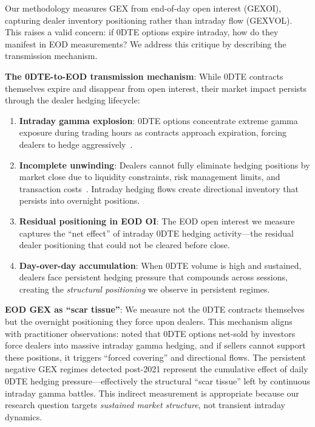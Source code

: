 \vspace{0.2cm}

Our methodology measures GEX from end-of-day open interest (GEX\textunderscore OI), capturing dealer inventory positioning rather than intraday flow (GEX\textunderscore VOL). This raises a valid concern: if 0DTE options expire intraday, how do they manifest in EOD measurements? We address this critique by describing the transmission mechanism.

\vspace{0.2cm}

\noindent\textbf{The 0DTE-to-EOD transmission mechanism}: While 0DTE contracts themselves expire and disappear from open interest, their market impact persists through the dealer hedging lifecycle:

\vspace{0.1cm}

\begin{enumerate}
\item \textbf{Intraday gamma explosion}: 0DTE options concentrate extreme gamma exposure during trading hours as contracts approach expiration, forcing dealers to hedge aggressively~\citep{dim2025zero}.

\item \textbf{Incomplete unwinding}: Dealers cannot fully eliminate hedging positions by market close due to liquidity constraints, risk management limits, and transaction costs~\citep{garleanu2013dynamic}. Intraday hedging flows create directional inventory that persists into overnight positions.

\item \textbf{Residual positioning in EOD OI}: The EOD open interest we measure captures the ``net effect'' of intraday 0DTE hedging activity—the residual dealer positioning that could not be cleared before close.

\item \textbf{Day-over-day accumulation}: When 0DTE volume is high and sustained, dealers face persistent hedging pressure that compounds across sessions, creating the \textit{structural positioning} we observe in persistent regimes.
\end{enumerate}

\vspace{0.2cm}

\noindent\textbf{EOD GEX as ``scar tissue''}: We measure not the 0DTE contracts themselves but the overnight positioning they force upon dealers. This mechanism aligns with practitioner observations: \citet{kolanovic2023volmageddon} noted that 0DTE options net-sold by investors force dealers into massive intraday gamma hedging, and if sellers cannot support these positions, it triggers ``forced covering'' and directional flows. The persistent negative GEX regimes detected post-2021 represent the cumulative effect of daily 0DTE hedging pressure—effectively the structural ``scar tissue'' left by continuous intraday gamma battles. This indirect measurement is appropriate because our research question targets \textit{sustained market structure}, not transient intraday dynamics.


